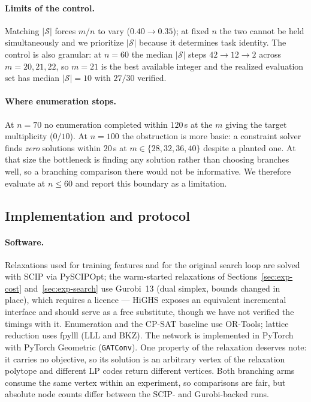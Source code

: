 \documentclass[preprint,12pt]{elsarticle}
\newcommand{\SOL}{\mathcal{S}}
\begin{document}
\paragraph{Limits of the control.} Matching $|\SOL|$ forces $m/n$ to vary ($0.40\to0.35$); at fixed $n$ the two cannot be held simultaneously and we prioritize $|\SOL|$ because it determines task identity. The control is also granular: at $n=60$ the median $|\SOL|$ steps $42\to12\to2$ across $m=20,21,22$, so $m=21$ is the best available integer and the realized evaluation set has median $|\SOL|=10$ with $27/30$ verified.

\paragraph{Where enumeration stops.} At $n=70$ no enumeration completed within $120$\,s at the $m$ giving the target multiplicity ($0/10$). At $n=100$ the obstruction is more basic: a constraint solver finds \emph{zero} solutions within $20$\,s at $m\in\{28,32,36,40\}$ despite a planted one. At that size the bottleneck is finding any solution rather than choosing branches well, so a branching comparison there would not be informative. We therefore evaluate at $n\le 60$ and report this boundary as a limitation.

\subsection{Implementation and protocol}
\label{sec:exp-protocol}

\paragraph{Software.} Relaxations used for training features and for the original search loop are solved with SCIP via PySCIPOpt; the warm-started relaxations of Sections~\ref{sec:exp-cost} and~\ref{sec:exp-search} use Gurobi~13 (dual simplex, bounds changed in place), which requires a licence --- HiGHS exposes an equivalent incremental interface and should serve as a free substitute, though we have not verified the timings with it. Enumeration and the CP-SAT baseline use OR-Tools; lattice reduction uses fpylll (LLL and BKZ). The network is implemented in PyTorch with PyTorch Geometric (\texttt{GATConv}). One property of the relaxation deserves note: it carries no objective, so its solution is an arbitrary vertex of the relaxation polytope and different LP codes return different vertices. Both branching arms consume the same vertex within an experiment, so comparisons are fair, but absolute node counts differ between the SCIP- and Gurobi-backed runs.
\end{document}
